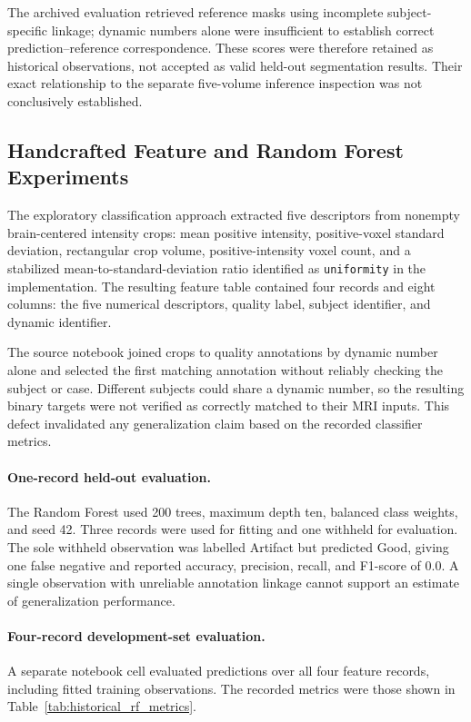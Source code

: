 The archived evaluation retrieved reference masks using incomplete subject-specific linkage; dynamic numbers alone were insufficient to establish correct prediction--reference correspondence. These scores were therefore retained as historical observations, not accepted as valid held-out segmentation results. Their exact relationship to the separate five-volume inference inspection was not conclusively established.

\subsection{Handcrafted Feature and Random Forest Experiments}
\label{subsec:historical_rf_results}

The exploratory classification approach extracted five descriptors from nonempty brain-centered intensity crops: mean positive intensity, positive-voxel standard deviation, rectangular crop volume, positive-intensity voxel count, and a stabilized mean-to-standard-deviation ratio identified as \texttt{uniformity} in the implementation. The resulting feature table contained four records and eight columns: the five numerical descriptors, quality label, subject identifier, and dynamic identifier.

The source notebook joined crops to quality annotations by dynamic number alone and selected the first matching annotation without reliably checking the subject or case. Different subjects could share a dynamic number, so the resulting binary targets were not verified as correctly matched to their MRI inputs. This defect invalidated any generalization claim based on the recorded classifier metrics.

\paragraph{One-record held-out evaluation.}
The Random Forest used 200 trees, maximum depth ten, balanced class weights, and seed 42. Three records were used for fitting and one withheld for evaluation. The sole withheld observation was labelled Artifact but predicted Good, giving one false negative and reported accuracy, precision, recall, and F1-score of 0.0. A single observation with unreliable annotation linkage cannot support an estimate of generalization performance.

\paragraph{Four-record development-set evaluation.}
A separate notebook cell evaluated predictions over all four feature records, including fitted training observations. The recorded metrics were those shown in Table~\ref{tab:historical_rf_metrics}.

